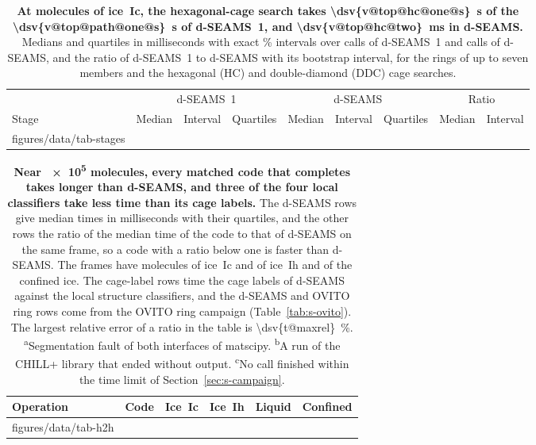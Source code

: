 \documentclass[preprint,12pt]{elsarticle}
\makeatletter
\newcommand{\tabbody}[1]{\@@input #1 }
\makeatother
\begin{document}
\begin{table}
\bigskip \caption{\textbf{At  molecules of ice~Ic, the
hexagonal-cage search takes \qty{\dsv{v@top@hc@one@s}}{\second} of the
\qty{\dsv{v@top@path@one@s}}{\second} of d-SEAMS~1, and
\qty{\dsv{v@top@hc@two}}{\milli\second} in d-SEAMS.} Medians and
quartiles in milliseconds with exact \% intervals
over  calls of d-SEAMS~1 and
 calls of d-SEAMS, and the ratio of d-SEAMS~1 to
d-SEAMS with its bootstrap interval, for the rings of up to seven
members and the hexagonal (HC) and double-diamond (DDC) cage searches.}
\label{tab:s-stages} \setlength{\tabcolsep}{4pt}
\begin{tabular}{@{}lrccrccrc@{}}
\toprule
 & \multicolumn{3}{c}{d-SEAMS~1} & \multicolumn{3}{c}{d-SEAMS} & \multicolumn{2}{c}{Ratio} \\
\cmidrule(lr){2-4}\cmidrule(lr){5-7}\cmidrule(l){8-9}
Stage & Median & Interval & Quartiles & Median & Interval & Quartiles & Median & Interval \\
\midrule
\tabbody{figures/data/tab-stages}
\bottomrule
\end{tabular}
\end{table}

\begin{table}[tbp]
\centering
\caption{\textbf{Near \num{e5} molecules, every matched code that completes takes
longer than d-SEAMS, and three of the four local classifiers take less
time than its cage labels.}
The d-SEAMS rows give median times in milliseconds with their quartiles,
and the other rows the ratio of the median time of the code to that of
d-SEAMS on the same frame, so a code with a ratio below one is faster
than d-SEAMS.
The frames have  molecules of ice~Ic and of ice~Ih
and  of the confined ice.
The cage-label rows time the cage labels of d-SEAMS against the local
structure classifiers, and the d-SEAMS and OVITO ring rows come from the
OVITO ring campaign (Table~\ref{tab:s-ovito}).
The largest relative error of a ratio in the table is
\qty{\dsv{t@maxrel}}{\percent}.
\textsuperscript{a}Segmentation fault of both interfaces of matscipy.
\textsuperscript{b}A run of the CHILL+ library that ended without
output.
\textsuperscript{c}No call finished within the time limit of
Section~\ref{sec:s-campaign}.}
\label{tab:s-h2h}
\small
\setlength{\tabcolsep}{4pt}
\begin{tabular}{@{}llrrrr@{}}
\toprule
Operation & Code & Ice~Ic & Ice~Ih & Liquid & Confined \\
\midrule
\tabbody{figures/data/tab-h2h}
\bottomrule
\end{tabular}
\end{table}
\end{document}
